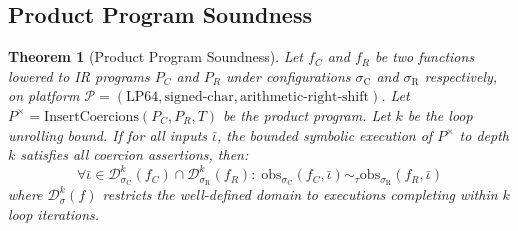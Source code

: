\documentclass[11pt]{article}
\newtheorem{theorem}{Theorem}[section]
\newcommand{\SemConfig}{\sigma}
\newcommand{\SemConfigC}{\sigma_{\mathrm{C}}}
\newcommand{\SemConfigR}{\sigma_{\mathrm{R}}}
\newcommand{\obs}{\mathrm{obs}}
\begin{document}
\subsection{Product Program Soundness}

\begin{theorem}[Product Program Soundness]
\label{thm:soundness}
Let $f_C$ and $f_R$ be two functions lowered to IR programs $P_C$ and $P_R$ under configurations $\SemConfigC$ and $\SemConfigR$ respectively, on platform $\mathcal{P} = (\text{LP64}, \text{signed-char}, \text{arithmetic-right-shift})$. Let $P^\times = \mathrm{InsertCoercions}(P_C, P_R, T)$ be the product program. Let $k$ be the loop unrolling bound. If for all inputs $\bar{\iota}$, the bounded symbolic execution of $P^\times$ to depth $k$ satisfies all coercion assertions, then:
\[
\forall \bar{\iota} \in \mathcal{D}^k_{\SemConfigC}(f_C) \cap \mathcal{D}^k_{\SemConfigR}(f_R):\; \obs_{\SemConfigC}(f_C, \bar{\iota}) \sim_\tau \obs_{\SemConfigR}(f_R, \bar{\iota})
\]
where $\mathcal{D}^k_\SemConfig(f)$ restricts the well-defined domain to executions completing within $k$ loop iterations.
\end{theorem}
\end{document}
